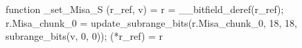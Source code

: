 function _set_Misa_S (r_ref, v) = {
    r = __bitfield_deref(r_ref);
    r.Misa_chunk_0 = update_subrange_bits(r.Misa_chunk_0, 18, 18, subrange_bits(v, 0, 0));
    (*r_ref) = r
}
